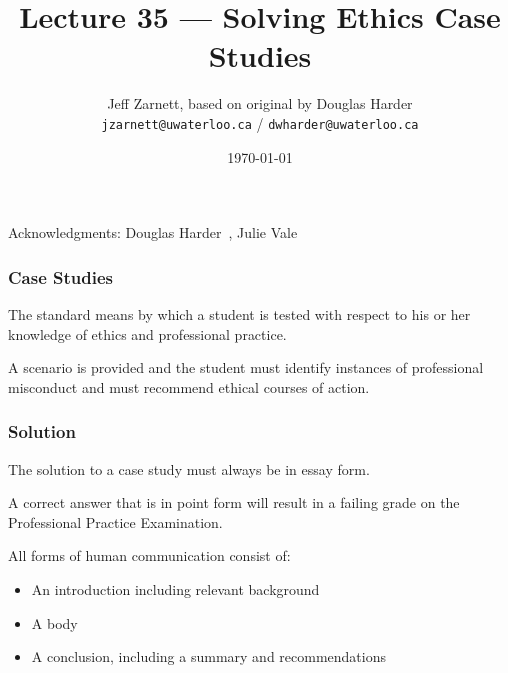 

\title{Lecture 35 --- Solving Ethics Case Studies }

\author{Jeff Zarnett, based on original by Douglas Harder \\ \small \texttt{jzarnett@uwaterloo.ca} / \texttt{dwharder@uwaterloo.ca}}
\date{\today}




\begin{frame}
  \titlepage

\begin{center}
  \small{Acknowledgments: Douglas Harder~\cite{dwh}, Julie Vale~\cite{jv}}
  \end{center}
\end{frame}



\begin{frame}
\frametitle{Case Studies}

The standard means by which a student is tested with respect to his or her knowledge of ethics and professional practice.

A scenario is provided and the student must identify instances of professional misconduct and must recommend ethical courses of action.

\end{frame}



\begin{frame}
\frametitle{Solution}

The solution to a case study must always be in essay form.

A correct answer that is in point form will result in a failing grade on the Professional Practice Examination.

All forms of human communication consist of:
\begin{itemize}
	\item An introduction including relevant background
	\item A body
	\item A conclusion, including a summary and recommendations
\end{itemize}

\end{frame}



